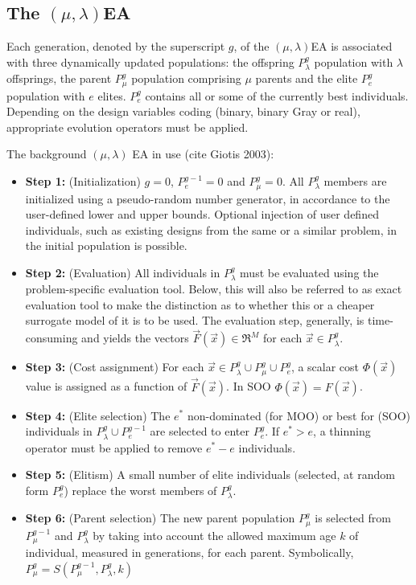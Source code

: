 \subsection{The $(\mu,\lambda)$EA}
\label{MLEA}
Each generation, denoted by the superscript $g$, of the $(\mu,\lambda)$EA is associated with three dynamically updated populations: the offspring $P_{\lambda}^g$ population with $\lambda$ offsprings, the parent $P_{\mu}^g$ population comprising $\mu$ parents and the elite $P_{e}^g$ population with $e$ elites. $P_{e}^g$ contains all or some of the currently best individuals. Depending on the design variables coding (binary, binary Gray or real), appropriate evolution operators must be applied. 

The background $(\mu,\lambda)$ EA in use (cite Giotis 2003):
\begin{itemize}
\item[]{\bf Step 1:}  (Initialization) $g=0$, $P_{e}^{g-1}=0$ and $P_{\mu}^g=0$. All $P_{\lambda}^g$  members are initialized using a pseudo-random number generator, in accordance to the user-defined lower and upper bounds. Optional injection of user defined individuals, such as existing designs from the same or a similar problem, in the initial population is possible. 
\item[]{\bf Step 2:}  (Evaluation) All individuals in $P_{\lambda}^g$ must be evaluated using the problem-specific evaluation tool. Below, this will also be referred to as exact evaluation tool to make the distinction as to whether this or a cheaper surrogate model of it is to be used. The evaluation step, generally, is time-consuming and yields the vectors $\vec{F}(\vec{x}) \in \Re^{M} $ for each $\vec{x} \in P_{\lambda}^g$.
\item[]{\bf Step 3:}  (Cost assignment) For each $\vec{x} \in P_{\lambda}^g \cup P_{\mu}^g \cup P_{e}^g$, a scalar cost $\Phi(\vec{x})$ value is assigned as a function of $\vec{F}(\vec{x})$. In SOO $\Phi(\vec{x})=F(\vec{x})$.
\item[]{\bf Step 4:}  (Elite selection) The $e^*$ non-dominated (for MOO) or best for (SOO) individuals in $P_{\lambda}^g \cup P_{e}^{g-1}$ are selected to enter $P_e^g$. If $e^* > e$, a thinning operator must be applied to remove $e^* - e$ individuals.     
\item[]{\bf Step 5:}  (Elitism) A small number of elite individuals (selected, at random form $P_e^g$) replace the worst members of $P_{\lambda}^g$.  
\item[]{\bf Step 6:}  (Parent selection) The new parent population $P_{\mu}^{g}$ is selected from $P_{\mu}^{g-1}$ and $P_{\lambda}^g$ by taking into account the allowed maximum age  $k$ of individual, measured in generations, for each parent. Symbolically, $P_{\mu}^{g}=S(P_{\mu}^{g-1},P_{\lambda}^g,k)$ 

\end{itemize}
